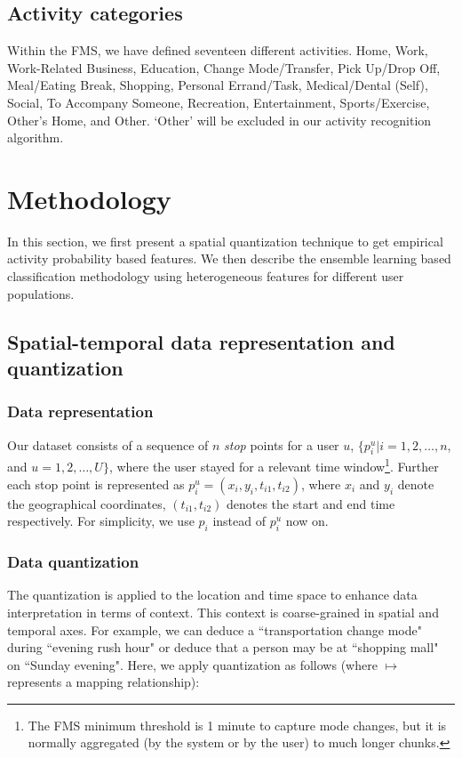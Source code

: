 \documentclass{sig-alternate}
\begin{document}
\subsection{Activity categories}
Within the FMS, we have defined seventeen different activities. Home, Work, Work-Related Business, Education, Change Mode/Transfer, Pick Up/Drop Off, Meal/Eating Break, Shopping, Personal Errand/Task, Medical/Dental (Self), Social, To Accompany Someone, Recreation, Entertainment,  Sports/Exercise, Other's Home, and Other. `Other' will be excluded in our activity recognition algorithm.



\section{Methodology}
 In this section, we first present a spatial quantization technique to get empirical activity probability based features. We then describe the ensemble learning based classification methodology using heterogeneous features for different user populations.


\subsection{Spatial-temporal data representation and quantization}


\subsubsection{Data representation}


Our dataset consists of a sequence of $n$ \emph{stop} points for a user $u$, $\{p_i^u | i=1,2,\ldots,n$, and $u = 1,2,\ldots,U \}$, where the user  stayed for a relevant time window\footnote{The FMS minimum threshold is 1 minute to capture mode changes, but it is normally aggregated (by the system or by the user) to much longer chunks.}. Further each stop point is represented as $p_i^u = (x_i, y_i, t_{i1}, t_{i2})$, where $x_i$ and $y_i$ denote the geographical coordinates, $(t_{i1}, t_{i2})$ denotes the start and end time respectively. For simplicity, we use $p_i$ instead of $p_i^u$ now on.


\subsubsection{Data quantization}
 The quantization is applied to the location and time space to enhance data interpretation in terms of context. This context is coarse-grained in spatial and temporal axes. For example, we can deduce a ``transportation change mode" during ``evening rush hour" or deduce that a person may be at ``shopping mall" on ``Sunday evening".  Here, we apply quantization as follows (where $\mapsto$ represents a mapping relationship):
\end{document}
